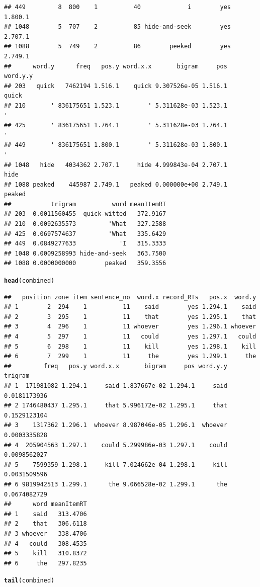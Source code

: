 \documentclass{article}\usepackage[]{graphicx}\usepackage[]{color}
\makeatletter
\newcommand{\hlstd}[1]{\textcolor[rgb]{0.345,0.345,0.345}{#1}}%
\newcommand{\hlkwd}[1]{\textcolor[rgb]{0.737,0.353,0.396}{\textbf{#1}}}%
\newenvironment{kframe}{%
 \def\at@end@of@kframe{}%
 \ifinner\ifhmode%
  \def\at@end@of@kframe{\end{minipage}}%
  \begin{minipage}{\columnwidth}%
 \fi\fi%
 \def\FrameCommand##1{\hskip\@totalleftmargin \hskip-\fboxsep
 \colorbox{shadecolor}{##1}\hskip-\fboxsep
     \hskip-\linewidth \hskip-\@totalleftmargin \hskip\columnwidth}%
 \MakeFramed {\advance\hsize-\width
   \@totalleftmargin\z@ \linewidth\hsize
   \@setminipage}}%
 {\par\unskip\endMakeFramed%
 \at@end@of@kframe}
\newenvironment{knitrout}{}{} %
\makeatother
\begin{document}
\begin{knitrout}
\begin{kframe}
\begin{verbatim}
## 449         8  800    1          40             i        yes 1.800.1
## 1048        5  707    2          85 hide-and-seek        yes 2.707.1
## 1088        5  749    2          86        peeked        yes 2.749.1
##      word.y      freq   pos.y word.x.x       bigram     pos word.y.y
## 203   quick   7462194 1.516.1    quick 9.307526e-05 1.516.1    quick
## 210       ' 836175651 1.523.1        ' 5.311628e-03 1.523.1        '
## 425       ' 836175651 1.764.1        ' 5.311628e-03 1.764.1        '
## 449       ' 836175651 1.800.1        ' 5.311628e-03 1.800.1        '
## 1048   hide   4034362 2.707.1     hide 4.999843e-04 2.707.1     hide
## 1088 peaked    445987 2.749.1   peaked 0.000000e+00 2.749.1   peaked
##           trigram          word meanItemRT
## 203  0.0011560455  quick-witted   372.9167
## 210  0.0092635573         'What   327.2588
## 425  0.0697574637         'What   335.6429
## 449  0.0849277633            'I   315.3333
## 1048 0.0009258993 hide-and-seek   363.7500
## 1088 0.0000000000        peaked   359.3556
\end{verbatim}
\begin{alltt}
\hlkwd{head}\hlstd{(combined)}
\end{alltt}
\begin{verbatim}
##   position zone item sentence_no  word.x record_RTs   pos.x  word.y
## 1        2  294    1          11    said        yes 1.294.1    said
## 2        3  295    1          11    that        yes 1.295.1    that
## 3        4  296    1          11 whoever        yes 1.296.1 whoever
## 4        5  297    1          11   could        yes 1.297.1   could
## 5        6  298    1          11    kill        yes 1.298.1    kill
## 6        7  299    1          11     the        yes 1.299.1     the
##         freq   pos.y word.x.x       bigram     pos word.y.y      trigram
## 1  171981082 1.294.1     said 1.837667e-02 1.294.1     said 0.0181173936
## 2 1746480437 1.295.1     that 5.996172e-02 1.295.1     that 0.1529123104
## 3    1317362 1.296.1  whoever 8.987046e-05 1.296.1  whoever 0.0003335828
## 4  205904563 1.297.1    could 5.299986e-03 1.297.1    could 0.0098562027
## 5    7599359 1.298.1     kill 7.024662e-04 1.298.1     kill 0.0031509596
## 6 9819942513 1.299.1      the 9.066528e-02 1.299.1      the 0.0674082729
##      word meanItemRT
## 1    said   313.4706
## 2    that   306.6118
## 3 whoever   338.4706
## 4   could   308.4535
## 5    kill   310.8372
## 6     the   297.8235
\end{verbatim}
\begin{alltt}
\hlkwd{tail}\hlstd{(combined)}

\end{alltt}
\end{kframe}
\end{knitrout}
\end{document}

